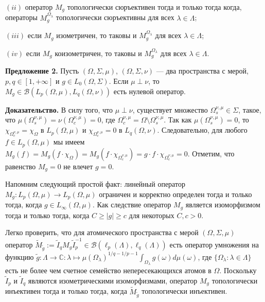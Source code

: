 \documentclass[11pt,twoside]{article}
\begin{document}
$(ii)$ оператор $M_g$ топологически сюръективен тогда и только тогда когда,
операторы $M_g^{\Omega_\lambda}$ топологически сюръективны для всех
$\lambda\in\Lambda$;

$(iii)$ если $M_g$ изометричен, то таковы и $M_g^{\Omega_\lambda}$ для всех
$\lambda\in\Lambda$;

$(iv)$ если $M_g$ коизометричен, то таковы и $M_g^{\Omega_\lambda}$ для всех
$\lambda\in\Lambda$.

\textbf{Предложение 2.} Пусть $(\Omega,\Sigma,\mu)$, $(\Omega,\Sigma,\nu)$ ---
два пространства с мерой, $p,q\in[1,+\infty]$ и $g\in L_0(\Omega,\Sigma)$. Если
$\mu\perp\nu$, то $M_g\in\mathcal{B}(L_p(\Omega,\mu), L_q(\Omega,\nu))$ есть
нулевой оператор.

\textbf{Доказательство.} В силу того, что $\mu\perp\nu$, существует множество
$\Omega_s^{\nu,\mu}\in\Sigma$, такое, что
$\mu(\Omega_s^{\nu,\mu})=\nu(\Omega_c^{\nu,\mu})=0$, где
$\Omega_c^{\nu,\mu}=\Omega\setminus\Omega_s^{\nu,\mu}$. Так как
$\mu(\Omega_s^{\nu,\mu})=0$, то  $\chi_{\Omega_c^{\nu,\mu}}=\chi_{\Omega}$ в
$L_p(\Omega,\mu)$ и  $\chi_{\Omega_c^{\nu,\mu}}=0$ в $L_q(\Omega,\nu)$.
Следовательно, для любого $f\in L_p(\Omega,\mu)$ мы имеем 
$M_g(f)
    =M_g(f\cdot \chi_{\Omega})
    =M_g(f\cdot \chi_{\Omega_c^{\nu,\mu}})
    =g\cdot f\cdot\chi_{\Omega_c^{\nu,\mu}}=0$. 
Отметим, что равенство  $M_g=0$ не влечет $g=0$.

























Напомним следующий простой факт: линейный оператор
$M_g:L_p(\Omega,\mu)\to L_p(\Omega,\mu)$ ограничен и корректно определен тогда
и только тогда, когда $g\in L_\infty(\Omega,\mu)$. Как следствие оператор
$M_g$ является изоморфизмом тогда и только тогда, когда $C\geq |g|\geq c$ для
некоторых $C,c>0$.

Легко проверить, что для атомического пространства с мерой 
$(\Omega,\Sigma,\mu)$ оператор 
$\widetilde{M}_{\widetilde{g}}
    :=\widetilde{I}_q M_g\widetilde{I}_p^{-1}
    \in\mathcal{B}(\ell_p(\Lambda),\ell_q(\Lambda))$ 
есть оператор умножения на функцию 
$\widetilde{g}:\Lambda\to\mathbb{C}:\lambda
    \mapsto {\mu(\Omega_\lambda)}^{1/q-1/p-1}
    \int_{\Omega_\lambda}g(\omega)d\mu(\omega)$,
где $\{\Omega_\lambda:\lambda\in\Lambda \}$ есть не более чем счетное семейство
непересекающихся атомов в $\Omega$. Поскольку $\widetilde{I}_p$ и
$\widetilde{I}_q$  являются изометрическими изоморфизмами, оператор $M_g$
топологически инъективен тогда и только тогда, когда
$\widetilde{M}_{\widetilde{g}}$ топологически инъективен.
\end{document}
